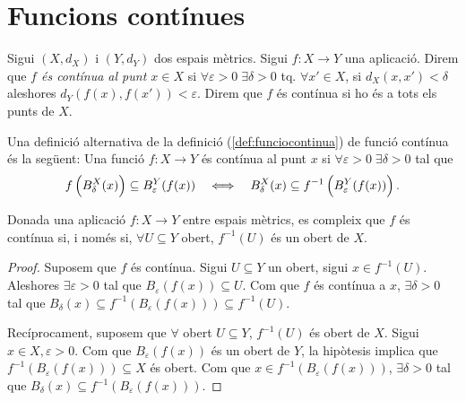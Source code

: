 \documentclass[../main.tex]{subfiles}
\begin{document}
\section{Funcions contínues}

\begin{defi}
\label{def:funciocontinua} Sigui $(X,d_X)$ i $(Y,d_Y)$ dos espais mètrics. Sigui $f:X\rightarrow Y$ una aplicació. Direm que \textit{$f$ és contínua al punt $x\in X$} si $\forall \varepsilon>0\;\exists\delta>0$ tq. $\forall x'\in X$, si $d_X(x,x')<\delta$ aleshores $d_Y(f(x),f(x'))<\varepsilon$. Direm que $f$ és contínua si ho és a tots els punts de $X$.
\end{defi}


\begin{nota}
\label{nota:definicioalternativadefunciocontinua} Una definició alternativa de la definició (\ref{def:funciocontinua}) de funció contínua és la següent: Una funció $f:X\rightarrow Y$ és contínua al punt $x$ si $\forall \varepsilon>0\;\exists\delta>0$ tal que 
\begin{equation}
    \notag
    f\left(B_{\delta}^X(x)\right)\subseteq B_\varepsilon^Y(f(x)) \quad \Longleftrightarrow \quad B_\delta^X(x)\subseteq f^{-1}\left(B_\varepsilon^Y(f(x))\right).
\end{equation}
\end{nota}


\begin{ter}
\label{ter:propietatsdefuncionscontinuesioberts} Donada una aplicació $f:X\rightarrow Y$ entre espais mètrics, es compleix que $f$ és contínua si, i només si, $\forall U\subseteq Y$ obert, $f^{-1}(U)$ és un obert de $X$.
\end{ter}
\begin{proof}
Suposem que $f$ és contínua. Sigui $U\subseteq Y$ un obert, sigui $x\in f^{-1}(U)$. Aleshores $\exists \varepsilon>0$ tal que $B_\varepsilon(f(x))\subseteq U$. Com que $f$ és contínua a $x$, $\exists \delta>0$ tal que $B_\delta(x)\subseteq f^{-1}(B_\varepsilon(f(x)))\subseteq f^{-1}(U)$.

Recíprocament, suposem que $\forall$ obert $U\subseteq Y$, $f^{-1}(U)$ és obert de $X$. Sigui $x\in X,\varepsilon>0$. Com que $B_\varepsilon(f(x))$ és un obert de $Y$, la hipòtesis implica que $f^{-1}(B_\varepsilon(f(x)))\subseteq X$ és obert. Com que $x\in f^{-1}(B_\varepsilon(f(x)))$, $\exists \delta>0$ tal que $B_\delta(x)\subseteq f^{-1}(B_\varepsilon(f(x)))$.
\end{proof}
\end{document}
